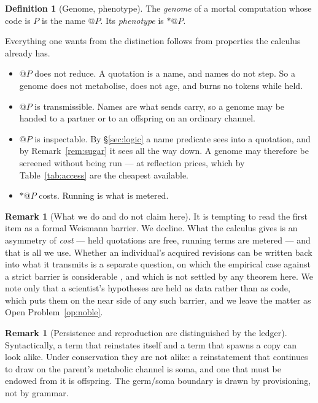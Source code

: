 \documentclass[11pt]{article}
\theoremstyle{plain}
\theoremstyle{definition}
\newtheorem{definition}[theorem]{Definition}
\newtheorem{remark}[theorem]{Remark}
\begin{document}
\begin{definition}[Genome, phenotype]
\label{def:genome}
The \emph{genome} of a mortal computation whose code is $P$ is the name $@P$. Its \emph{phenotype} is
$\ast @P$.
\end{definition}

Everything one wants from the distinction follows from properties the calculus already has.

\begin{itemize}
\item $@P$ does not reduce. A quotation is a name, and names do not step. So a genome does not
metabolise, does not age, and burns no tokens while held.
\item $@P$ is transmissible. Names are what sends carry, so a genome may be handed to a partner or
to an offspring on an ordinary channel.
\item $@P$ is inspectable. By \S\ref{sec:logic} a name predicate sees into a quotation, and by
Remark~\ref{rem:sugar} it sees all the way down. A genome may therefore be screened without being
run --- at reflection prices, which by Table~\ref{tab:access} are the cheapest available.
\item $\ast @P$ costs. Running is what is metered.
\end{itemize}

\begin{remark}[What we do and do not claim here]
\label{rem:noble}
It is tempting to read the first item as a formal Weismann barrier. We decline. What the calculus
gives is an asymmetry of \emph{cost} --- held quotations are free, running terms are metered --- and
that is all we use. Whether an individual's acquired revisions can be written back into what it
transmits is a separate question, on which the empirical case against a strict barrier is
considerable \cite{Noble}, and which is not settled by any theorem here. We note only that a
scientist's hypotheses are held as data rather than as code, which puts them on the near side of any
such barrier, and we leave the matter as Open Problem~\ref{op:noble}.
\end{remark}

\begin{remark}[Persistence and reproduction are distinguished by the ledger]
\label{rem:provision}
Syntactically, a term that reinstates itself and a term that spawns a copy can look alike. Under
conservation they are not alike: a reinstatement that continues to draw on the parent's metabolic
channel is soma, and one that must be endowed from it is offspring. The germ/soma boundary is drawn by
provisioning, not by grammar.
\end{remark}
\end{document}
